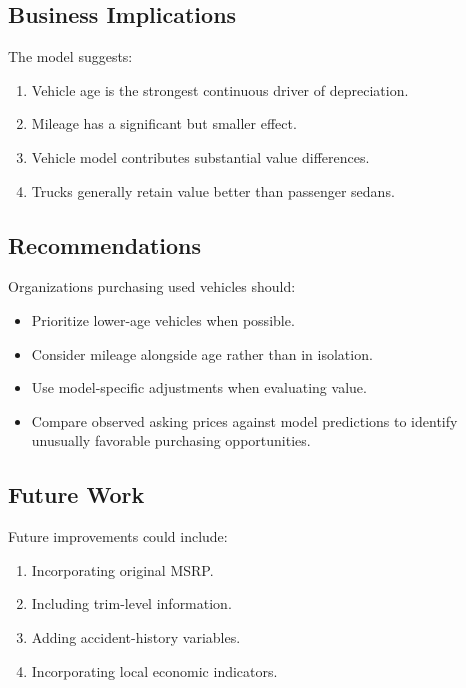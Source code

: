 \documentclass[
  12pt]{article}
\providecommand{\tightlist}{%
  \setlength{\itemsep}{0pt}\setlength{\parskip}{0pt}}
\begin{document}
\subsection{Business Implications}\label{business-implications}

The model suggests:

\begin{enumerate}
\def\labelenumi{\arabic{enumi}.}
\tightlist
\item
  Vehicle age is the strongest continuous driver of depreciation.
\item
  Mileage has a significant but smaller effect.
\item
  Vehicle model contributes substantial value differences.
\item
  Trucks generally retain value better than passenger sedans.
\end{enumerate}

\subsection{Recommendations}\label{recommendations}

Organizations purchasing used vehicles should:

\begin{itemize}
\tightlist
\item
  Prioritize lower-age vehicles when possible.
\item
  Consider mileage alongside age rather than in isolation.
\item
  Use model-specific adjustments when evaluating value.
\item
  Compare observed asking prices against model predictions to identify
  unusually favorable purchasing opportunities.
\end{itemize}

\subsection{Future Work}\label{future-work}

Future improvements could include:

\begin{enumerate}
\def\labelenumi{\arabic{enumi}.}
\tightlist
\item
  Incorporating original MSRP.
\item
  Including trim-level information.
\item
  Adding accident-history variables.
\item
  Incorporating local economic indicators.
\end{enumerate}
\end{document}
